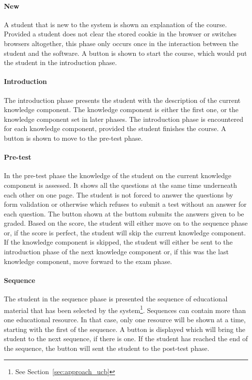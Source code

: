 \paragraph{New} A student that is new to the system is shown an explanation of
the course. Provided a student does not clear the stored cookie in the browser
or switches browsers altogether, this phase only occurs once in the interaction
between the student and the software. A button is shown to start the course,
which would put the student in the introduction phase.
\paragraph{Introduction} The introduction phase presents the student with the
description of the current knowledge component. The knowledge component is
either the first one, or the knowledge component set in later phases. The
introduction phase is encountered for each knowledge component, provided the
student finishes the course. A button is shown to move to the pre-test phase.
\paragraph{Pre-test} In the pre-test phase the knowledge of the student on the
current knowledge component is assessed. It shows all the questions at the same
time underneath each other on one page. The student is not forced to answer the
questions by form validation or otherwise which refuses to submit a test
without an answer for each question. The button shown at the buttom submits the
answers given to be graded. Based on the score, the student will either move on
to the sequence phase or, if the score is perfect, the student will skip the
current knowledge component. If the knowledge component is skipped, the student
will either be sent to the introduction phase of the next knowledge component
or, if this was the last knowledge component, move forward to the exam phase.
\paragraph{Sequence} The student in the sequence phase is presented the
sequence of educational material that has been selected by the
system\footnote{See Section~\ref{sec:approach_ucb}}. Sequences can contain more
than one educational resource. In that case, only one resource will be shown at
a time, starting with the first of the sequence. A button is displayed which
will bring the student to the next sequence, if there is one. If the student
has reached the end of the sequence, the button will sent the student to the
post-test phase.
